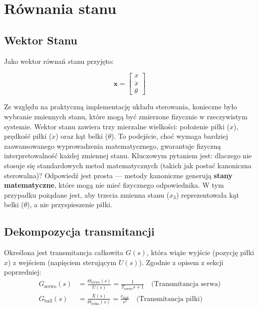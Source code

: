 \section{Równania stanu}

\subsection{Wektor Stanu}

Jako wektor równań stanu przyjęto:

\begin{equation}
\mathbf{x}=\begin{bmatrix}
    x \\ \dot{x} \\ \theta
\end{bmatrix}
\end{equation}

Ze względu na praktyczną implementację układu sterowania, konieczne było wybranie zmiennych stanu, które mogą być zmierzone fizycznie w rzeczywistym systemie. Wektor stanu zawiera trzy mierzalne wielkości: położenie piłki ($x$), prędkość piłki ($\dot{x}$) oraz kąt belki ($\theta$). To podejście, choć wymaga bardziej zaawansowanego wyprowadzenia matematycznego, gwarantuje fizyczną interpretowalność każdej zmiennej stanu.
Kluczowym pytaniem jest: dlaczego nie stosuje się standardowych metod matematycznych (takich jak postać kanoniczna sterowalna)? Odpowiedź jest prosta — metody kanoniczne generują \textbf{stany matematyczne}, które mogą nie mieć fizycznego odpowiednika. W tym przypadku pożądane jest, aby trzecia zmienna stanu ($x_3$) reprezentowała kąt belki ($\theta$), a nie przyspieszenie piłki. 

\subsection{Dekompozycja transmitancji}

Określona jest transmitancja całkowita $G(s)$, która wiąże wyjście (pozycję piłki $x$) z
wejściem (napięciem sterującym $U(s)$). Zgodnie z opisem z sekcji
poprzedniej:
\begin{align}
G_{\mathrm{serwo}}(s) &= \frac{\Theta_{\mathrm{serwo}}(s)}{U(s)} = \frac{1}{T_{\mathrm{serwo}} s + 1} \quad \text{(Transmitancja serwa)}\\
G_{\mathrm{ball}}(s) &= \frac{X(s)}{\Theta_{\mathrm{belka}}(s)} = \frac{c_{\mathrm{ball}}}{s^2} \quad \text{(Transmitancja piłki)}
\end{align}

